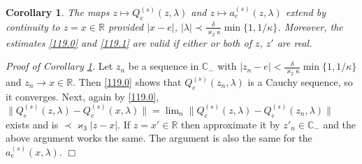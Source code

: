 \documentclass[letterpaper,onecolumn,11pt,accepted=2021-12-09]{quantumarticle}
\numberwithin{equation}{section}
\newcounter{resultcounter}[section]
\newtheorem{cor}[resultcounter]{Corollary}
\newcommand{\aes}{a_e^{(s)}}
\newcommand{\Qes}{Q_e^{(s)}}
\def\qed{\hfill $\Box$\medskip}
\begin{document}
\begin{cor}
	\label{cor1}
The maps $z\mapsto \Qes(z,\lambda)$ and $z\mapsto \aes(z,\lambda)$ extend by continuity to $z=x\in{\mathbb R}$ provided $|x-e|$, $|\lambda|\prec \frac{\delta}{\varkappa_2\kappa} \min\{1,1/\kappa\}$. Moreover, the estimates \eqref{119.0} and \eqref{119.1} are valid if either or both of $z$, $z'$ are real. 
\end{cor}

{\em Proof of Corollary \ref{cor1}. } Let $z_n$ be a sequence in ${\mathbb C}_-$ with $|z_n-e|< \frac{\delta}{\varkappa_2\kappa}\min\{1,1/\kappa\}$ and $z_n\rightarrow x\in\mathbb R$. Then \eqref{119.0} shows that $\Qes(z_n,\lambda)$ is a Cauchy sequence, so it converges. Next, again by \eqref{119.0}, $\|\Qes(z,\lambda) - \Qes(x,\lambda) \|= \lim_n \|\Qes(z,\lambda) - \Qes(z_n,\lambda)\|$ exists and is $\prec\varkappa_3 |z-x|$. 
If $z=x'\in\mathbb R$ then approximate it by $z'_n\in{\mathbb C}_-$ and the above argument works the same. The argument is also the same for the $\aes(x,\lambda)$. \hfill \qed




\medskip
\end{document}
